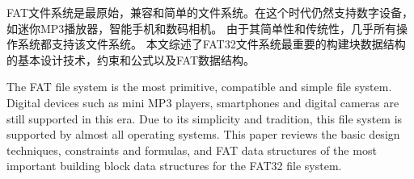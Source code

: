 \begin{cabstract}
FAT文件系统是最原始，兼容和简单的文件系统。在这个时代仍然支持数字设备，如迷你MP3播放器，智能手机和数码相机。 由于其简单性和传统性，几乎所有操作系统都支持该文件系统。 本文综述了FAT32文件系统最重要的构建块数据结构的基本设计技术，约束和公式以及FAT数据结构。
\end{cabstract}


\begin{eabstract}
The FAT file system is the most primitive, compatible and simple file system. Digital devices such as mini MP3 players, smartphones and digital cameras are still supported in this era. Due to its simplicity and tradition, this file system is supported by almost all operating systems. This paper reviews the basic design techniques, constraints and formulas, and FAT data structures of the most important building block data structures for the FAT32 file system.
\end{eabstract}

